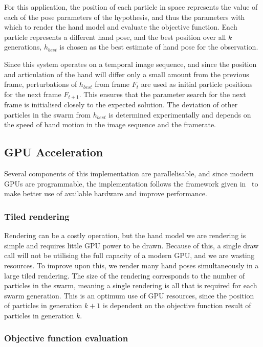 \documentclass[10pt,a4paper,notitlepage,twocolumn]{report}
\begin{document}
For this application, the position of each particle in space represents the
value of each of the pose parameters of the hypothesis, and thus the parameters
with which to render the hand model and evaluate the objective function.  Each
particle represents a different hand pose, and the best position over all $k$
generations, $h_{best}$ is chosen as the best estimate of hand pose for the 
observation.

Since this system operates on a temporal image sequence, and since the position
and articulation of the hand will differ only a small amount from the previous 
frame,
perturbations of $h_{best}$ from frame $F_t$ are used as initial particle
positions for the next frame $F_{t+1}$.  This ensures that the parameter search
for the next frame is initialised closely to the expected solution.  The
deviation of other particles in the swarm from $h_{best}$ is determined
experimentally and depends on the speed of hand motion in the image sequence and
the framerate.

\subsection{GPU Acceleration}

Several components of this implementation are parallelisable, and since modern
GPUs are programmable, the implementation follows the framework given
in~\cite{kyriazis2011} to make better use of available hardware and improve
performance.

\subsubsection{Tiled rendering}

Rendering can be a costly operation, but the hand model we are rendering is
simple and requires little GPU power to be drawn.  Because of this, a single
draw call will not be utilising the full capacity of a modern GPU, and we are
wasting resources.  To improve upon this, we render many hand poses
simultaneously in a large tiled rendering.  The size of the rendering
corresponds to the number of particles in the swarm, meaning a single rendering 
is all that is required for each swarm generation.  This is an optimum use of
GPU resources, since the position of particles in generation $k+1$ is
dependent on the objective function result of particles in generation $k$.

\subsubsection{Objective function evaluation}
\end{document}
